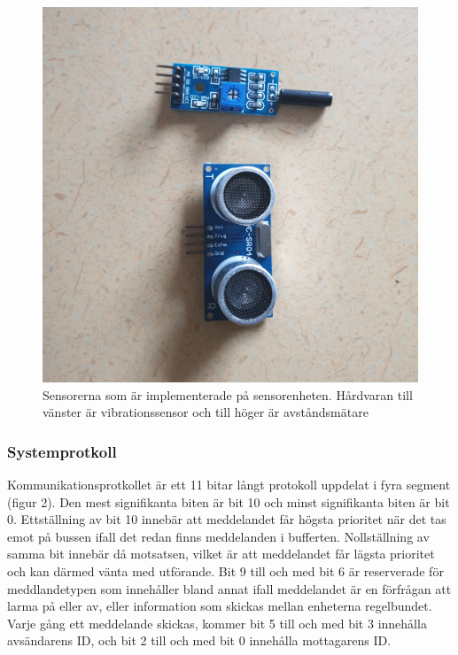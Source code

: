 \documentclass{article}
\begin{document}
\begin{figure}[!tbp]
    \centering
    \includegraphics[scale=0.04]{Projektrapport/sensor.png}
    \caption {Sensorerna som är implementerade på sensorenheten. Hårdvaran till vänster är vibrationssensor och till höger är avståndsmätare}
    \label{fig:drawing}
\end{figure}


\subsubsection{Systemprotkoll}
Kommunikationsprotkollet är ett 11 bitar långt protokoll uppdelat i fyra segment (figur 2).
Den mest signifikanta biten är bit 10 och minst signifikanta biten är bit 0. 
Ettställning av bit 10 innebär att meddelandet får högsta prioritet när det tas emot på bussen ifall det redan finns meddelanden i bufferten.
Nollställning av samma bit innebär då motsatsen, vilket är att meddelandet får lägsta prioritet och kan därmed vänta med utförande. 
Bit 9 till och med bit 6 är reserverade för meddlandetypen som innehåller bland annat ifall meddelandet är en förfrågan att larma på eller av, eller information som skickas mellan enheterna regelbundet. 
Varje gång ett meddelande skickas, kommer bit 5 till och med bit 3 innehålla avsändarens ID, och bit 2 till och med bit 0 innehålla mottagarens ID.
\end{document}
